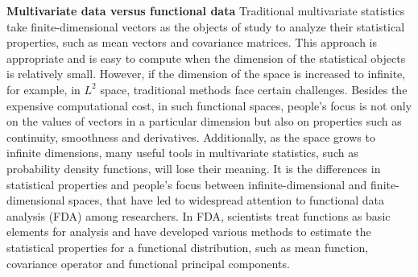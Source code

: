 \documentclass{article}
\begin{document}
\textbf{Multivariate data versus functional data} 
Traditional multivariate statistics take finite-dimensional vectors as the objects of study to analyze their statistical properties, such as mean vectors and covariance matrices. 
This approach is appropriate and is easy to compute when the dimension of the statistical objects is relatively small. 
However, if the dimension of the space is increased to infinite, for example, in $L^2$ space, traditional methods face certain challenges. 
Besides the expensive computational cost, in such functional spaces, people's focus is not only on the values of vectors in a particular dimension but also on properties such as continuity, smoothness and derivatives. 
Additionally, as the space grows to infinite dimensions, many useful tools in multivariate statistics, such as probability density functions, will lose their meaning. 
It is the differences in statistical properties and people's focus between infinite-dimensional and finite-dimensional spaces, that have led to widespread attention to functional data analysis (FDA) \cite{wang2016functional,kokoszka2017introduction} among researchers.
In FDA, scientists treat functions as basic elements for analysis and have developed various methods to estimate the statistical properties for a functional distribution, such as mean function, covariance operator and functional principal components.
\end{document}
